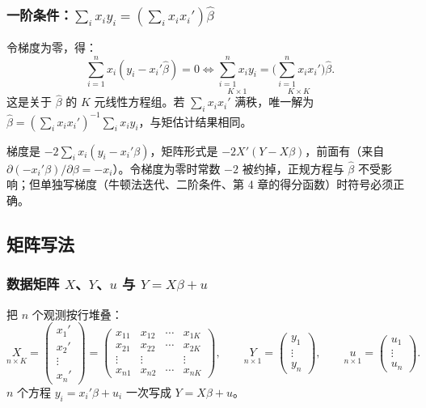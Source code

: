 \subsubsection{一阶条件：\texorpdfstring{$\sum_ix_iy_i=(\sum_ix_ix_i')\hat\beta$}{sum x y = (sum x x') beta-hat}}

令梯度为零，得：
\begin{equation}\label{eq:U03-foc}
\sum_{i=1}^n x_i(y_i-x_i'\hat\beta)=0
\iff
\underset{K\times1}{\sum_{i=1}^n x_iy_i}=\underset{K\times K}{\Big(\sum_{i=1}^n x_ix_i'\Big)}\hat\beta .
\end{equation}
这是关于 $\hat\beta$ 的 $K$ 元线性方程组。若 $\sum_ix_ix_i'$ 满秩，唯一解为 $\hat\beta=(\sum_ix_ix_i')^{-1}\sum_ix_iy_i$，与矩估计结果相同。

\begin{note}[梯度前的负号不能漏]
梯度是 $-2\sum_ix_i(y_i-x_i'\beta)$，矩阵形式是 $-2X'(Y-X\beta)$，前面有（来自 $\partial(-x_i'\beta)/\partial\beta=-x_i$）。令梯度为零时常数 $-2$ 被约掉，正规方程与 $\hat\beta$ 不受影响；但单独写梯度（牛顿法迭代、二阶条件、第 4 章的得分函数）时符号必须正确。
\end{note}

\subsection{矩阵写法}\label{ss:U03-matrix}

\subsubsection{数据矩阵 \texorpdfstring{$X$、$Y$、$u$}{X, Y, u} 与 \texorpdfstring{$Y=X\beta+u$}{Y = X beta + u}}

把 $n$ 个观测按行堆叠：
\[
\underset{n\times K}{X}=\begin{pmatrix}x_1'\\ x_2'\\ \vdots\\ x_n'\end{pmatrix}
=\begin{pmatrix}x_{11}&x_{12}&\cdots&x_{1K}\\ x_{21}&x_{22}&\cdots&x_{2K}\\ \vdots&\vdots&&\vdots\\ x_{n1}&x_{n2}&\cdots&x_{nK}\end{pmatrix},\qquad
\underset{n\times1}{Y}=\begin{pmatrix}y_1\\ \vdots\\ y_n\end{pmatrix},\qquad
\underset{n\times1}{u}=\begin{pmatrix}u_1\\ \vdots\\ u_n\end{pmatrix}.
\]
$n$ 个方程 $y_i=x_i'\beta+u_i$ 一次写成 $Y=X\beta+u$。

